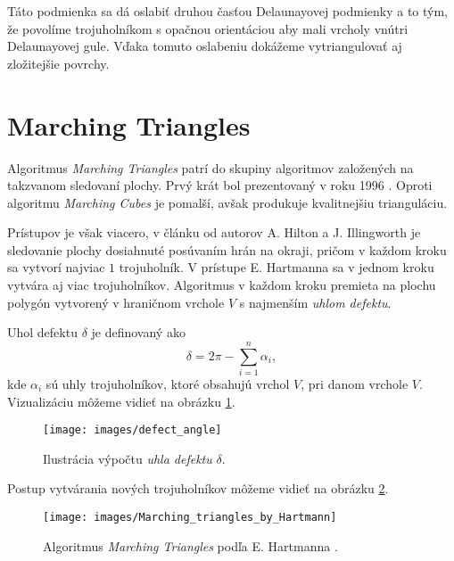 Táto podmienka sa dá oslabiť druhou časťou
Delaunayovej podmienky a to tým, že povolíme trojuholníkom s opačnou orientáciou aby mali vrcholy vnútri
Delaunayovej gule. Vďaka tomuto oslabeniu dokážeme vytriangulovať aj zložitejšie povrchy.


\section{Marching Triangles}

\label{kap:marching_triangles}

Algoritmus \textit{Marching Triangles} patrí do skupiny algoritmov založených na takzvanom 
sledovaní plochy. Prvý krát bol prezentovaný v roku 1996 \cite{hilton1996marching}. 
Oproti algoritmu \textit{Marching Cubes} je pomalší, avšak produkuje kvalitnejšiu trianguláciu. 

Prístupov je však viacero, v článku od autorov A. Hilton a J. Illingworth \cite{hilton1996marching}
je sledovanie plochy dosiahnuté posúvaním hrán na okraji, pričom v každom kroku sa vytvorí 
najviac $1$ trojuholník. V prístupe E. Hartmanna \cite{hartmann1998marching} sa v jednom kroku 
vytvára aj viac trojuholníkov. Algoritmus v každom kroku premieta na plochu polygón vytvorený
v hraničnom vrchole $V$ s najmenším \textit{uhlom defektu}. 

\begin{definition}
    Uhol defektu $\delta$ je definovaný ako 
    $$ \delta = 2 \pi - \sum_{i=1}^{n} \alpha_i,$$
    kde $\alpha_i$ sú uhly trojuholníkov, ktoré obsahujú vrchol $V$, pri danom vrchole $V$.
    Vizualizáciu môžeme vidieť na obrázku \ref{obr:defect_angle}.
\end{definition}


\begin{figure}
    \centerline{\texttt{[image: images/defect\_angle]}}
    \caption[Uhol defektu]
    {Ilustrácia výpočtu \textit{uhla defektu} $\delta$.}
    \label{obr:defect_angle}
\end{figure}

Postup vytvárania nových trojuholníkov môžeme vidieť na obrázku \ref{obr:Marching_triangles_by_Hartmann}.

\begin{figure}
    \centerline{\texttt{[image: images/Marching\_triangles\_by\_Hartmann]}}
    \caption[Algoritmus \textit{Marching Triangles} podľa E. Hartmanna]
    {Algoritmus \textit{Marching Triangles} podľa E. Hartmanna \cite{hartmann1998marching}.}
    \label{obr:Marching_triangles_by_Hartmann}
\end{figure}

